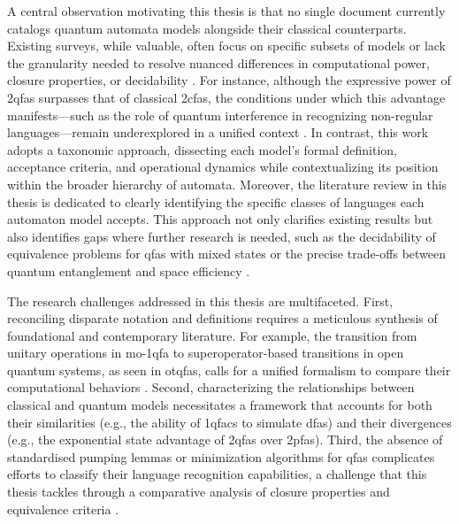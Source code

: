A central observation motivating this thesis is that no single document currently catalogs quantum automata models alongside their classical counterparts. Existing surveys, while valuable, often focus on specific subsets of models or lack the granularity needed to resolve nuanced differences in computational power, closure properties, or decidability \cite{gruska2012quantum}. For instance, although the expressive power of \glspl{2qfa} surpasses that of classical \glspl{2cfa}, the conditions under which this advantage manifests—such as the role of quantum interference in recognizing non-regular languages—remain underexplored in a unified context \cite{yakaryilmaz2010succinctness}. In contrast, this work adopts a taxonomic approach, dissecting each model’s formal definition, acceptance criteria, and operational dynamics while contextualizing its position within the broader hierarchy of automata. Moreover, the literature review in this thesis is dedicated to clearly identifying the specific classes of languages each automaton model accepts. This approach not only clarifies existing results but also identifies gaps where further research is needed, such as the decidability of equivalence problems for \glspl{qfa} with mixed states or the precise trade-offs between quantum entanglement and space efficiency \cite{hirvensalo2012quantum}.  

The research challenges addressed in this thesis are multifaceted. First, reconciling disparate notation and definitions requires a meticulous synthesis of foundational and contemporary literature. For example, the transition from unitary operations in \gls{mo-1qfa} to superoperator-based transitions in open quantum systems, as seen in \glspl{otqfa}, calls for a unified formalism to compare their computational behaviors \cite{bertoni2001quantum, breuer2002theory}. Second, characterizing the relationships between classical and quantum models necessitates a framework that accounts for both their similarities (e.g., the ability of \glspl{1qfac} to simulate \glspl{dfa}) and their divergences (e.g., the exponential state advantage of \glspl{2qfa} over \glspl{2pfa}). Third, the absence of standardised pumping lemmas or minimization algorithms for \glspl{qfa} complicates efforts to classify their language recognition capabilities, a challenge that this thesis tackles through a comparative analysis of closure properties and equivalence criteria \cite{yakaryilmaz2014quantum}.

